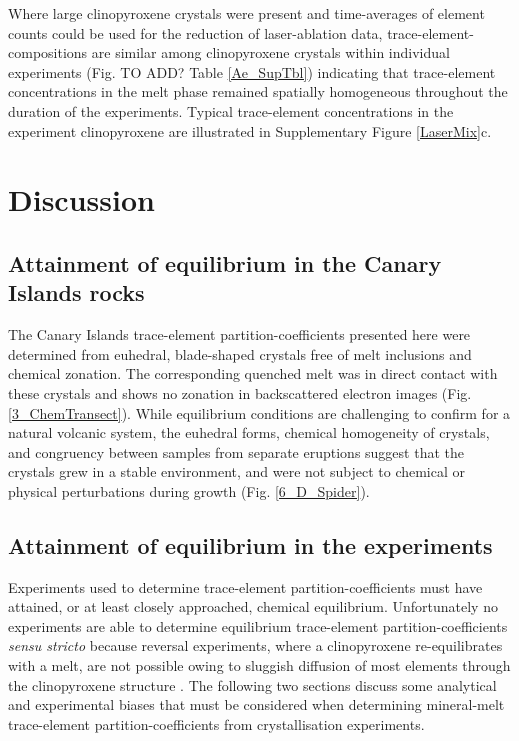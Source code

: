 \documentclass[final,authoryear,3p,times,twocolumn]{elsarticle}
\begin{document}
Where large clinopyroxene crystals were present and time-averages of element counts could be used for the reduction of laser-ablation data, trace-element-compositions are similar among clinopyroxene crystals within individual experiments (Fig. TO ADD? Table \ref{Ae_SupTbl}) indicating that trace-element concentrations in the melt phase remained spatially homogeneous throughout the duration of the experiments. Typical trace-element concentrations in the experiment clinopyroxene are illustrated in Supplementary Figure \ref{LaserMix}c.

	

\section{Discussion}
\subsection{Attainment of equilibrium in the Canary Islands rocks}
The Canary Islands trace-element partition-coefficients presented here were determined from euhedral, blade-shaped crystals free of melt inclusions and chemical zonation. The corresponding quenched melt was in direct contact with these crystals and shows no zonation in backscattered electron images (Fig. \ref{3_ChemTransect}). While equilibrium conditions are challenging to confirm for a natural volcanic system, the euhedral forms, chemical homogeneity of crystals, and congruency between samples from separate eruptions suggest that the crystals grew in a stable environment, and were not subject to chemical or physical perturbations during growth (Fig. \ref{6_D_Spider}).	

\subsection{Attainment of equilibrium in the experiments}
Experiments used to determine trace-element partition-coefficients must have attained, or at least closely approached, chemical equilibrium. Unfortunately no experiments are able to determine equilibrium trace-element partition-coefficients \emph{sensu stricto} because reversal experiments, where a clinopyroxene re-equilibrates with a melt, are not possible owing to sluggish diffusion of most elements through the clinopyroxene structure \citep{VanOrman2001,Zhang2010}.
     The following two sections discuss some analytical and experimental biases that must be considered when determining mineral-melt trace-element partition-coefficients from crystallisation experiments.
\end{document}
